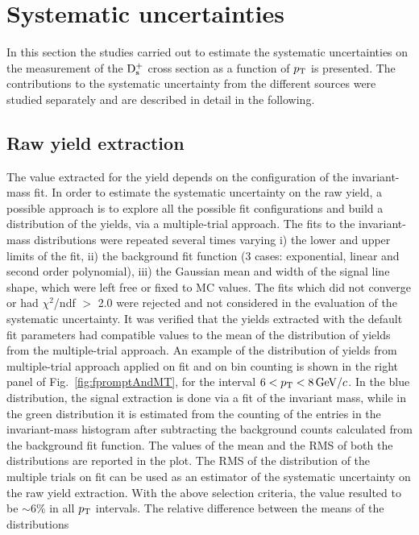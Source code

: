 \section{Systematic uncertainties}
\label{sec:systPP}
In this section the studies carried out to estimate the systematic uncertainties on the
 measurement of the ${\rm D_s^+}$ cross section as a function of $p_{\rm T}$ is presented. 
 The contributions to the systematic uncertainty from the different 
 sources were studied separately and are described in detail in the following.

\subsection{Raw yield extraction}
\label{sec:RawYieldSyst}
The value extracted for the yield depends on the  
configuration of the invariant-mass fit.
In order to estimate the systematic uncertainty on the raw yield,
a possible approach is to explore all the possible fit configurations and build
a distribution of the yields, via a multiple-trial approach. The fits to the invariant-mass 
distributions were repeated several times varying
i) the lower and upper limits of the fit, 
ii) the background fit function (3 cases: exponential, linear and second 
order polynomial), iii) the Gaussian mean and width of the signal line shape, 
which were left free or fixed to MC
values. The fits which did not converge or had $\chi^2$/ndf $>$ 2.0 
were rejected and not considered in the evaluation of the 
systematic uncertainty. It was verified that the yields extracted with the
default fit parameters had compatible values to the mean of
the distribution of yields from the multiple-trial approach. 
An example of the distribution of yields from multiple-trial approach applied on fit and on
bin counting is shown in the right panel of Fig.~\ref{fig:fpromptAndMT},
for the interval $6 < p_{\rm T} < 8 \, \mathrm{GeV}/c$. 
In the blue distribution, the signal extraction is done via a fit of the invariant mass, while
in the green distribution it is estimated from the counting of the entries in the invariant-mass histogram after 
subtracting the background counts calculated from the 
background fit function.
The values of the mean and the RMS
of both the distributions are reported in the plot.
The RMS of the distribution of the multiple trials on fit can be used as an estimator of
the systematic uncertainty on the raw yield extraction. With the above
selection criteria, the value resulted to be $\sim$6\% in all $p_{\rm T}$ intervals.
The relative difference between the means of the distributions
